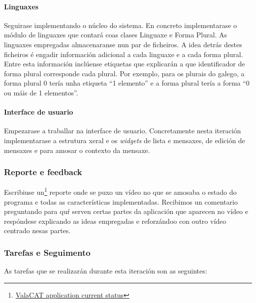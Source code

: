 \paragraph{Linguaxes}
Seguirase implementando o núcleo do sistema. En concreto implementarase o módulo de linguaxes que contará coas clases Linguaxe e Forma Plural. As linguaxes empregadas almacenaranse nun par de ficheiros. A idea detrás destes ficheiros é engadir información adicional a cada linguaxe e a cada forma plural. Entre esta información inclúense etiquetas que explicarán a que identificador de forma plural corresponde cada plural. Por exemplo, para os plurais do galego, a forma plural 0 tería unha etiqueta ``1 elemento'' e a forma plural tería a forma ``0 ou máis de 1 elementos''.

\paragraph{Interface de usuario}
Empezarase a traballar na interface de usuario. Concretamente nesta iteración implementarase a estrutura xeral e os \emph{widgets} de lista e mensaxes, de edición de mensaxes e para amosar o contexto da mensaxe.

\subsubsection{Reporte e feedback}
Escribiuse un\footnote{\href{http://aquelando.info/valacat-application-current-status/}{ValaCAT application current status}} reporte onde se puxo un vídeo no que se amosaba o estado do programa e todas as características implementadas. Recibimos un comentario preguntando para quŕ serven certas partes da aplicación que aparecen no vídeo e respóndese explicando as ideas empregadas e reforzándoo con outro vídeo centrado nesas partes.

\subsubsection{Tarefas e Seguimento}

As tarefas que se realizarán durante esta iteración son as seguintes:

